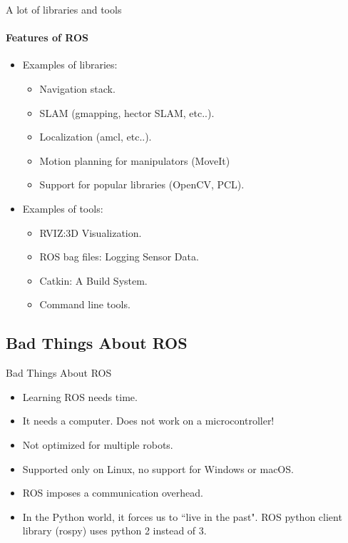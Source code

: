 \documentclass{beamer}
\begin{document}
\begin{frame}{A lot of libraries and tools}
    \framesubtitle{Features of ROS}    
    \begin{itemize}
        \item Examples of libraries:
            \begin{itemize}
                \item Navigation stack.
                \item SLAM (gmapping, hector SLAM, etc..).
                \item Localization (amcl, etc..).
                \item Motion planning for manipulators (MoveIt)
                \item Support for popular libraries (OpenCV, PCL).
            \end{itemize}
            
        \item Examples of tools:
            \begin{itemize}
                \item RVIZ:3D Visualization.
                \item ROS bag files: Logging Sensor Data.
                \item Catkin: A Build System.
                \item Command line tools.
            \end{itemize}        
    \end{itemize}
\end{frame}


\subsection{Bad Things About ROS}

\begin{frame}{Bad Things About ROS}
            \begin{itemize}
                \item Learning ROS needs time. 
                \item It needs a computer. Does not work on a microcontroller!
                \item Not optimized for multiple robots.
                \item Supported only on Linux, no support for Windows or macOS.
                \item ROS imposes a communication overhead.
                \item In the Python world, it forces us to ``live in the past". ROS python client library (rospy) uses python 2 instead of 3.
            \end{itemize}  
\end{frame}
\end{document}
